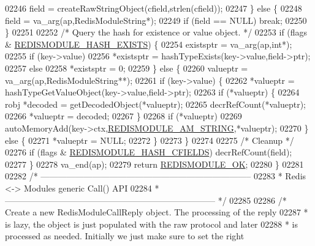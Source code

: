 \begin{DoxyCode}
{{{02246             field = createRawStringObject(cfield,strlen(cfield));
02247         \} \textcolor{keywordflow}{else} \{
02248             field = va\_arg(ap,RedisModuleString*);
02249             \textcolor{keywordflow}{if} (field == NULL) \textcolor{keywordflow}{break};
02250         \}
02251 
02252         \textcolor{comment}{/* Query the hash for existence or value object. */}
02253         \textcolor{keywordflow}{if} (flags & \hyperlink{redismodule_8h_af30d67dd15a4c35bfb57e20b645d65c4}{REDISMODULE\_HASH\_EXISTS}) \{
02254             existsptr = va\_arg(ap,\textcolor{keywordtype}{int}*);
02255             \textcolor{keywordflow}{if} (key->value)
02256                 *existsptr = hashTypeExists(key->value,field->ptr);
02257             \textcolor{keywordflow}{else}
02258                 *existsptr = 0;
02259         \} \textcolor{keywordflow}{else} \{
02260             valueptr = va\_arg(ap,RedisModuleString**);
02261             \textcolor{keywordflow}{if} (key->value) \{
02262                 *valueptr = hashTypeGetValueObject(key->value,field->ptr);
02263                 \textcolor{keywordflow}{if} (*valueptr) \{
02264                     robj *decoded = getDecodedObject(*valueptr);
02265                     decrRefCount(*valueptr);
02266                     *valueptr = decoded;
02267                 \}
02268                 \textcolor{keywordflow}{if} (*valueptr)
02269                     autoMemoryAdd(key->ctx,\hyperlink{module_8c_a566ace39ef8d3d16c3f7d9d6c6b8e4ef}{REDISMODULE\_AM\_STRING},*valueptr);
02270             \} \textcolor{keywordflow}{else} \{
02271                 *valueptr = NULL;
02272             \}
02273         \}
02274 
02275         \textcolor{comment}{/* Cleanup */}
02276         \textcolor{keywordflow}{if} (flags & \hyperlink{redismodule_8h_a0b45cc86dbd926d0af5d59a5f4c0e0da}{REDISMODULE\_HASH\_CFIELDS}) decrRefCount(field);
02277     \}
02278     va\_end(ap);
02279     \textcolor{keywordflow}{return} \hyperlink{redismodule_8h_a1bc5bfd69abcd378ff52c640adc5418d}{REDISMODULE\_OK};
02280 \}
02281 
02282 \textcolor{comment}{/* --------------------------------------------------------------------------}
02283 \textcolor{comment}{ * Redis <-> Modules generic Call() API}
02284 \textcolor{comment}{ * -------------------------------------------------------------------------- */}
02285 
02286 \textcolor{comment}{/* Create a new RedisModuleCallReply object. The processing of the reply}
02287 \textcolor{comment}{ * is lazy, the object is just populated with the raw protocol and later}
02288 \textcolor{comment}{ * is processed as needed. Initially we just make sure to set the right}
}}}
\end{DoxyCode}
